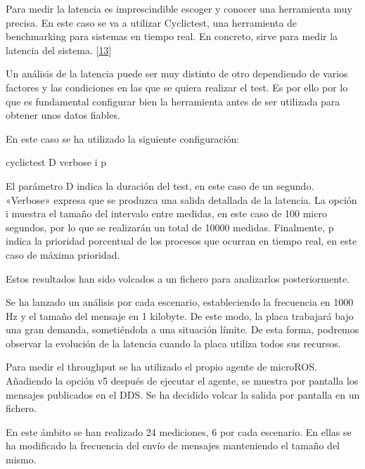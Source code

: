 \documentclass[a4paper,11pt,spanish]{sphinxmanual}
\begin{document}
\sphinxAtStartPar
Para medir la latencia es imprescindible escoger y conocer una herramienta
muy precisa. En este caso se va a utilizar Cyclictest, una herramienta de
benchmarking para sistemas en tiempo real. En concreto, sirve para medir la
latencia del sistema. {[}\hyperlink{cite.marco_teorico_y_estado_del_arte:id43}{13}{]}

\sphinxAtStartPar
Un análisis de la latencia puede ser muy distinto de otro dependiendo
de varios factores y las condiciones en las que se quiera realizar
el test. Es por ello por lo que es fundamental configurar bien la herramienta
antes de ser utilizada para obtener unos datos fiables.

\sphinxAtStartPar
En este caso se ha utilizado la siguiente configuración:

\begin{sphinxVerbatim}[commandchars=\\\{\},formatcom=\footnotesize]
cyclictest \PYGZhy{}D  \PYGZhy{}\PYGZhy{}verbose \PYGZhy{}i  \PYGZhy{}p 
\end{sphinxVerbatim}

\sphinxAtStartPar
El parámetro D indica la duración del test, en este caso de un segundo.
«Verbose» expresa que se produzca una salida detallada de la latencia.
La opción i muestra el tamaño del intervalo entre medidas, en este caso
de 100 micro segundos, por lo que se realizarán un total de 10000 medidas.
Finalmente, p indica la prioridad porcentual de los procesos que ocurran
en tiempo real, en este caso de máxima prioridad.

\sphinxAtStartPar
Estos resultados han sido volcados a un fichero para analizarlos posteriormente.

\sphinxAtStartPar
Se ha lanzado un análisis por cada escenario, estableciendo la frecuencia
en 1000 Hz y el tamaño del mensaje en 1 kilobyte. De este modo, la placa trabajará
bajo una gran demanda, sometiéndola a una situación límite. De esta forma,
podremos observar la evolución de la latencia cuando la placa utiliza
todos sus recursos.

\sphinxAtStartPar
Para medir el throughput se ha utilizado el propio agente de micro\sphinxhyphen{}ROS.
Añadiendo la opción \sphinxhyphen{}v5 después de ejecutar el agente, se muestra por pantalla
los mensajes publicados en el DDS. Se ha decidido volcar la salida por pantalla
en un fichero.

\sphinxAtStartPar
En este ámbito se han realizado 24 mediciones, 6 por cada escenario. En
ellas se ha modificado la frecuencia del envío de mensajes manteniendo
el tamaño del mismo.
\end{document}
